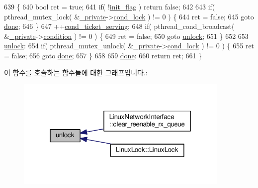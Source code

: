 \begin{DoxyCode}
639                            \{
640     \textcolor{keywordtype}{bool} ret = \textcolor{keyword}{true};
641     \textcolor{keywordflow}{if}( !\hyperlink{class_ticketing_lock_a9298e04a9d0130ff1545e0914d419de5}{init\_flag} ) \textcolor{keywordflow}{return} \textcolor{keyword}{false};
642 
643     \textcolor{keywordflow}{if}( pthread\_mutex\_lock( &\hyperlink{class_ticketing_lock_a351c5faad8218bb8571b5d784b7f364f}{\_private}->\hyperlink{struct_ticketing_lock_private_ae3e5051fe73e5989a4d275ba3f947f64}{cond\_lock} ) != 0 ) \{
644         ret = \textcolor{keyword}{false};
645         \textcolor{keywordflow}{goto} \hyperlink{mrp_validate_8c_a5992b274cfdcacdbc1fa8347fd01ebde}{done};
646     \}
647     ++\hyperlink{class_ticketing_lock_a4ee669f5608abcc6ffdfc0f5df01e6cf}{cond\_ticket\_serving};
648     \textcolor{keywordflow}{if}( pthread\_cond\_broadcast( &\hyperlink{class_ticketing_lock_a351c5faad8218bb8571b5d784b7f364f}{\_private}->\hyperlink{struct_ticketing_lock_private_a2d017047068ee847b500c14427ac4d6b}{condition} ) != 0 ) \{
649         ret = \textcolor{keyword}{false};
650         \textcolor{keywordflow}{goto} \hyperlink{class_ticketing_lock_ae399421ee39cae4df5ea44bd21e31254}{unlock};
651     \}
652 
653  \hyperlink{class_ticketing_lock_ae399421ee39cae4df5ea44bd21e31254}{unlock}:
654     \textcolor{keywordflow}{if}( pthread\_mutex\_unlock( &\hyperlink{class_ticketing_lock_a351c5faad8218bb8571b5d784b7f364f}{\_private}->\hyperlink{struct_ticketing_lock_private_ae3e5051fe73e5989a4d275ba3f947f64}{cond\_lock} ) != 0 ) \{
655         ret = \textcolor{keyword}{false};
656         \textcolor{keywordflow}{goto} \hyperlink{mrp_validate_8c_a5992b274cfdcacdbc1fa8347fd01ebde}{done};
657     \}
658 
659  \hyperlink{mrp_validate_8c_a5992b274cfdcacdbc1fa8347fd01ebde}{done}:
660     \textcolor{keywordflow}{return} ret;
661 \}
\end{DoxyCode}


이 함수를 호출하는 함수들에 대한 그래프입니다.\+:
\nopagebreak
\begin{figure}[H]
\begin{center}
\leavevmode
\includegraphics[width=292pt]{class_ticketing_lock_ae399421ee39cae4df5ea44bd21e31254_icgraph}
\end{center}
\end{figure}




